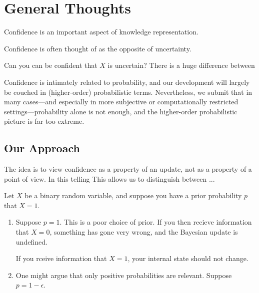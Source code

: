 \documentclass{article}
\begin{document}
    
    


    
\section{General Thoughts}
Confidence is an important aspect of knowledge representation.

Confidence is often thought of as the opposite of uncertainty.

Can you can be confident that $X$ is uncertain?
There is a huge difference between 



Confidence is intimately related to probability, and our development will largely be couched in (higher-order) probabilistic terms.
Nevertheless, we submit that in many cases---and especially in more subjective or computationally restricted settings---probability alone is not enough, and the higher-order probabilistic picture is far too extreme.



\subsection*{Our Approach}
The idea is to view confidence as a property of an update, not as a property of a point of view.  
In this telling
This allows us to distinguish between ...

\begin{example}
Let $X$ be a binary random variable, and suppose you have a prior probability $p$ that $X=1$.
\begin{enumerate}
    \item Suppose $p=1$. 
    This is a poor choice of prior. 
    If you then recieve information that $X=0$, something has gone very wrong, and the Bayesian update is undefined.
    
    If you rceive information that $X = 1$, your internal state should not change. 
    
    \item One might argue that only positive probabilities are relevant.
    Suppose $p = 1 - \epsilon$.
\end{enumerate}
\end{example}
\end{document}
